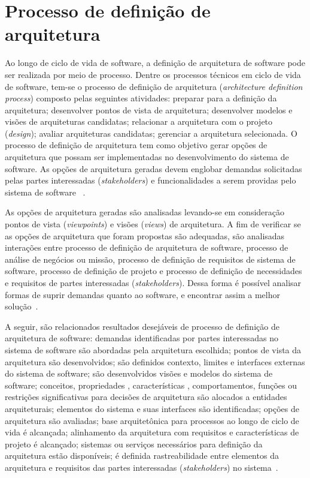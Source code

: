 \section{Processo de definição de arquitetura}

Ao longo de ciclo de vida de software, a definição de arquitetura de software pode ser realizada por meio de processo. Dentre os processos técnicos em ciclo de vida de software, tem-se o processo de definição de arquitetura (\emph{architecture definition process}) composto pelas seguintes atividades: preparar para a definição da arquitetura; desenvolver pontos de vista de arquitetura; desenvolver modelos e visões de arquiteturas candidatas; relacionar a arquitetura com o projeto (\emph{design}); avaliar arquiteturas candidatas; gerenciar a arquitetura selecionada. O processo de definição de arquitetura tem como objetivo gerar opções de arquitetura que possam ser implementadas no desenvolvimento do sistema de software. As opções de arquitetura geradas devem englobar demandas solicitadas pelas partes interessadas (\emph{stakeholders}) e funcionalidades a serem providas pelo sistema de software ~\cite{ISO_12207}.

As opções de arquitetura geradas são analisadas levando-se em consideração pontos de vista (\emph{viewpoints}) e visões (\emph{views}) de arquitetura. A fim de verificar se as opções de arquitetura que foram propostas são adequadas, são analisadas interações entre processo de definição de arquitetura de software, processo de análise de negócios ou missão, processo de definição de requisitos de sistema de software, processo de definição de projeto e processo de definição de necessidades e requisitos de partes interessadas (\emph{stakeholders}). Dessa forma é possível analisar formas de suprir demandas quanto ao software, e encontrar assim a melhor solução~\cite{ISO_12207}. 

A seguir, são relacionados resultados desejáveis de processo de definição de arquitetura de software: demandas identificadas por partes interessadas no sistema de software são abordadas pela arquitetura escolhida; pontos de vista da arquitetura são desenvolvidos; são definidos contexto, limites e interfaces externas do sistema de software; são desenvolvidos visões e modelos do sistema de software; 
conceitos, propriedades , características , comportamentos, 
funções ou restrições significativas para decisões de arquitetura são alocados a entidades arquiteturais; elementos do sistema e suas interfaces são identificadas; opções de arquitetura são avaliadas; base arquitetônica para processos ao longo de ciclo de vida é alcançada; 
alinhamento da arquitetura com requisitos e características de projeto é alcançado; sistemas ou serviços necessários para definição da arquitetura estão disponíveis; 
é definida rastreabilidade entre elementos da arquitetura e requisitos das partes interessadas (\emph{stakeholders}) no sistema~\cite{ISO_12207}.  

